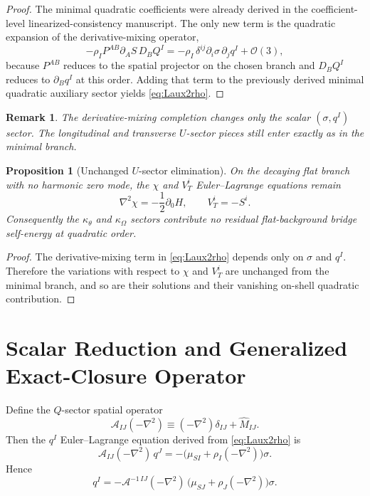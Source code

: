 \documentclass[11pt]{article}
\newtheorem{proposition}{Proposition}
\newtheorem{remark}{Remark}
\begin{document}
\begin{proof}
The minimal quadratic coefficients were already derived in the coefficient-level linearized-consistency manuscript. The only new term is the quadratic expansion of the derivative-mixing operator,
\[
-\rho_I P^{AB}\partial_A S\,D_BQ^I
=
-\rho_I\,\delta^{ij}\partial_i\sigma\,\partial_j q^I
+\mathcal O(3),
\]
because \(P^{AB}\) reduces to the spatial projector on the chosen branch and \(D_BQ^I\) reduces to \(\partial_Bq^I\) at this order. Adding that term to the previously derived minimal quadratic auxiliary sector yields \eqref{eq:Laux2rho}.
\end{proof}

\begin{remark}
The derivative-mixing completion changes only the scalar \((\sigma,q^I)\) sector. The longitudinal and transverse \(U\)-sector pieces still enter exactly as in the minimal branch.
\end{remark}

\begin{proposition}[Unchanged \(U\)-sector elimination]
On the decaying flat branch with no harmonic zero mode, the \(\chi\) and \(V_T^i\) Euler--Lagrange equations remain
\begin{equation}
\nabla^2\chi=-\frac{1}{2}\partial_0H,
\qquad
V_T^i=-S^i.
\label{eq:Uelimination}
\end{equation}
Consequently the \(\kappa_\theta\) and \(\kappa_\Omega\) sectors contribute no residual flat-background bridge self-energy at quadratic order.
\end{proposition}

\begin{proof}
The derivative-mixing term in \eqref{eq:Laux2rho} depends only on \(\sigma\) and \(q^I\). Therefore the variations with respect to \(\chi\) and \(V_T^i\) are unchanged from the minimal branch, and so are their solutions and their vanishing on-shell quadratic contribution.
\end{proof}

\section{Scalar Reduction and Generalized Exact-Closure Operator}

Define the \(Q\)-sector spatial operator
\begin{equation}
\mathcal A_{IJ}(-\nabla^2)
\equiv
(-\nabla^2)\delta_{IJ}+\widehat M_{IJ}.
\label{eq:Aoperator}
\end{equation}
Then the \(q^I\) Euler--Lagrange equation derived from \eqref{eq:Laux2rho} is
\begin{equation}
\mathcal A_{IJ}(-\nabla^2)\,q^J
=
-\bigl(\mu_{SI}+\rho_I(-\nabla^2)\bigr)\sigma.
\label{eq:qeqrho}
\end{equation}
Hence
\begin{equation}
q^I
=
-\mathcal A^{-1\,IJ}(-\nabla^2)\,
\bigl(\mu_{SJ}+\rho_J(-\nabla^2)\bigr)\sigma.
\label{eq:qsolverho}
\end{equation}
\end{document}
